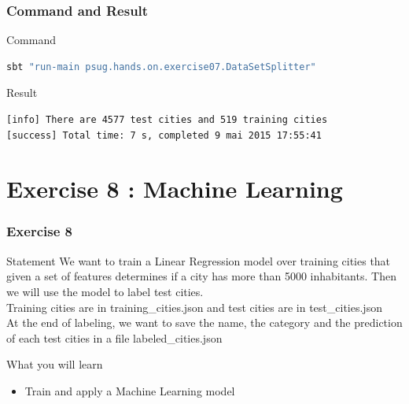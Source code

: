 \documentclass[slidetop,9pt,utf8]{beamer}
\begin{document}
\begin{CJK}{UTF8}{gbsn}
\begin{frame}[fragile]
\end{frame}

\begin{frame}[fragile]
  \frametitle{Command and Result}

  \begin{block}{Command}
    \begin{lstlisting}[language=bash, style=terminal-medium]
sbt "run-main psug.hands.on.exercise07.DataSetSplitter"  
    \end{lstlisting}
  \end{block}

  \begin{block}{Result}
    \begin{lstlisting}[language=bash, style=terminal]
[info] There are 4577 test cities and 519 training cities
[success] Total time: 7 s, completed 9 mai 2015 17:55:41
    \end{lstlisting}
  \end{block}

\end{frame}

\section{Exercise 8 : Machine Learning}

\begin{frame}
  \frametitle{Exercise 8}

  \begin{block}{Statement}
    We want to train a Linear Regression model over training cities that given a set of features determines if a city has more than 5000 inhabitants. Then we will use the model to label test cities. 
\\ \medskip
Training cities are in training\_cities.json and test cities are in test\_cities.json
\\ \medskip
At the end of labeling, we want to save the name, the category and the prediction of each test cities in a file labeled\_cities.json
  \end{block}

  \begin{block}{What you will learn}
    \begin{itemize}
      \item Train and apply a Machine Learning model
    \end{itemize}
  \end{block}

\end{frame}


\end{CJK}
\end{document}
